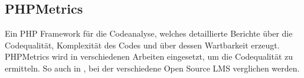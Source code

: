 \subsection{PHPMetrics}
Ein PHP Framework für die Codeanalyse, welches detaillierte Berichte über die Codequalität, Komplexität des Codes und über dessen Wartbarkeit erzeugt. PHPMetrics wird in verschiedenen Arbeiten eingesetzt, um die Codequalität zu ermitteln. So auch in \cite{anggrain-2016}, bei der verschiedene Open Source LMS verglichen werden.


